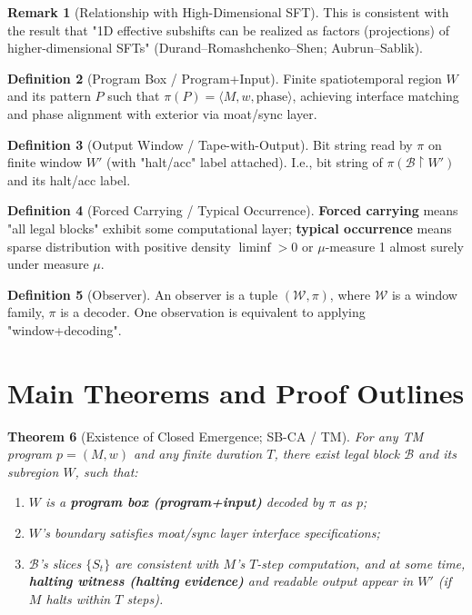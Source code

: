 \documentclass[12pt]{article}
\theoremstyle{plain}
\newtheorem{theorem}{Theorem}[section]
\theoremstyle{definition}
\newtheorem{definition}[theorem]{Definition}
\newtheorem{remark}[theorem]{Remark}
\begin{document}
\begin{remark}[Relationship with High-Dimensional SFT]
This is consistent with the result that "1D effective subshifts can be realized as factors (projections) of higher-dimensional SFTs" (Durand--Romashchenko--Shen\cite{durand2012}; Aubrun--Sablik\cite{aubrun2013}).
\end{remark}

\begin{definition}[Program Box / Program+Input]
Finite spatiotemporal region $W$ and its pattern $P$ such that $\pi(P) = \langle M, w, \mathrm{phase} \rangle$, achieving interface matching and phase alignment with exterior via moat/sync layer.
\end{definition}

\begin{definition}[Output Window / Tape-with-Output]
Bit string read by $\pi$ on finite window $W'$ (with "halt/acc" label attached). I.e., bit string of $\pi(\mathcal{B}\upharpoonright W')$ and its halt/acc label.
\end{definition}

\begin{definition}[Forced Carrying / Typical Occurrence]
\textbf{Forced carrying} means "all legal blocks" exhibit some computational layer; \textbf{typical occurrence} means sparse distribution with positive density $\liminf > 0$ or $\mu$-measure 1 almost surely under measure $\mu$.
\end{definition}

\begin{definition}[Observer]
An observer is a tuple $(\mathcal{W}, \pi)$, where $\mathcal{W}$ is a window family, $\pi$ is a decoder. One observation is equivalent to applying "window+decoding".
\end{definition}

\section{Main Theorems and Proof Outlines}

\begin{theorem}[Existence of Closed Emergence; SB-CA / TM]
For any TM program $p = (M, w)$ and any finite duration $T$, there exist legal block $\mathcal{B}$ and its subregion $W$, such that:

\begin{enumerate}
\item $W$ is a \textbf{program box (program+input)} decoded by $\pi$ as $p$;
\item $W$'s boundary satisfies moat/sync layer interface specifications;
\item $\mathcal{B}$'s slices $\{S_t\}$ are consistent with $M$'s $T$-step computation, and at some time, \textbf{halting witness (halting evidence)} and readable output appear in $W'$ (if $M$ halts within $T$ steps).
\end{enumerate}
\end{theorem}
\end{document}

